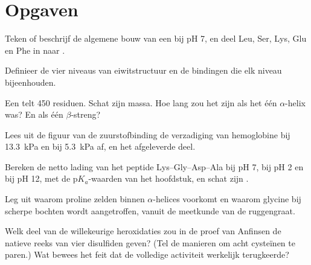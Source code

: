 \section{Opgaven}

\begin{exercise}[$\star$]\label{exo:b1:proteins:1}
Teken of beschrijf de algemene bouw van een  bij pH 7, en deel Leu, Ser,
Lys, Glu en Phe in naar .
\end{exercise}

\begin{exercise}[$\star$]\label{exo:b1:proteins:2}
Definieer de vier niveaus van eiwitstructuur en de bindingen die elk niveau
bijeenhouden.
\end{exercise}

\begin{exercise}[$\star$]\label{exo:b1:proteins:3}
Een  telt \qty{450}{} residuen. Schat zijn massa. Hoe lang zou het zijn als
het één $\alpha$-helix was? En als één $\beta$-streng?
\end{exercise}

\begin{exercise}[$\star$]\label{exo:b1:proteins:4}
Lees uit de figuur van de zuurstofbinding de verzadiging van hemoglobine bij
\qty{13.3}{kPa} en bij \qty{5.3}{kPa} af, en het afgeleverde deel.
\end{exercise}

\begin{exercise}[$\star\star$]\label{exo:b1:proteins:5}
Bereken de netto lading van het peptide Lys--Gly--Asp--Ala bij pH 7, bij pH 2 en
bij pH 12, met de p$K_a$-waarden van het hoofdstuk, en schat zijn .
\end{exercise}

\begin{exercise}[$\star\star$]\label{exo:b1:proteins:6}
Leg uit waarom proline zelden binnen $\alpha$-helices voorkomt en waarom glycine
bij scherpe bochten wordt aangetroffen, vanuit de meetkunde van de ruggengraat.
\end{exercise}

\begin{exercise}[$\star\star$]\label{exo:b1:proteins:7}
Welk deel van de willekeurige heroxidaties zou in de proef van Anfinsen de
natieve reeks van vier disulfiden geven? (Tel de manieren om acht cysteïnen te
paren.) Wat bewees het feit dat de volledige activiteit werkelijk terugkeerde?
\end{exercise}

